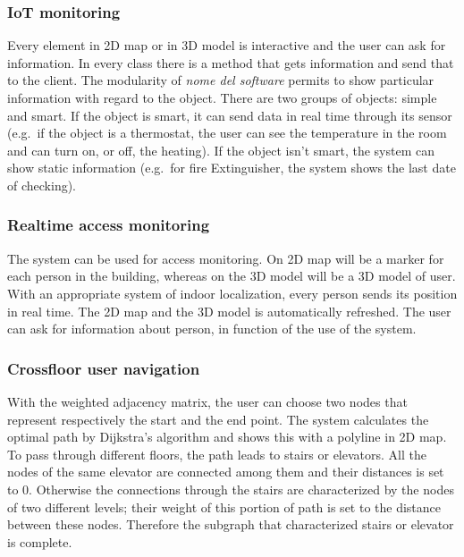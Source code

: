 \documentclass{sig-alternate}
\begin{document}
\subsubsection{IoT monitoring}\label{iot-monitoring}

Every element in 2D map or in 3D model is interactive and the user can
ask for information. In every class there is a method that gets
information and send that to the client. The modularity of \emph{nome
del software} permits to show particular information with regard to the
object. There are two groups of objects: simple and smart. If the object
is smart, it can send data in real time through its sensor (e.g.~if the
object is a thermostat, the user can see the temperature in the room and
can turn on, or off, the heating). If the object isn't smart, the system
can show static information (e.g.~for fire Extinguisher, the system
shows the last date of checking).

\subsubsection{Realtime access
monitoring}\label{realtime-access-monitoring}

The system can be used for access monitoring. On 2D map will be a marker
for each person in the building, whereas on the 3D model will be a 3D
model of user. With an appropriate system of indoor localization, every
person sends its position in real time. The 2D map and the 3D model is
automatically refreshed. The user can ask for information about person,
in function of the use of the system.

\subsubsection{Crossfloor user
navigation}\label{crossfloor-user-navigation}

With the weighted adjacency matrix, the user can choose two nodes that
represent respectively the start and the end point. The system
calculates the optimal path by Dijkstra's algorithm and shows this with
a polyline in 2D map. To pass through different floors, the path leads
to stairs or elevators. All the nodes of the same elevator are connected
among them and their distances is set to 0. Otherwise the connections
through the stairs are characterized by the nodes of two different
levels; their weight of this portion of path is set to the distance
between these nodes. Therefore the subgraph that characterized stairs or
elevator is complete.
\end{document}
